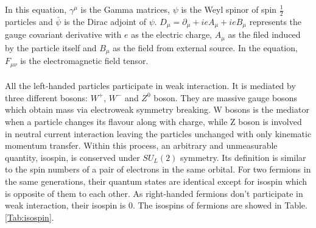 In this equation, $\gamma^\mu$ is the Gamma matrices, $\psi$ is the Weyl spinor of spin $\frac{1}{2}$ particles and $\bar{\psi}$ is the Dirac adjoint of $\psi$. $D_\mu=\partial_\mu+ieA_\mu+ieB_\mu$ represents the gauge covariant derivative with $e$ as the electric charge, $A_\mu$ as the filed induced by the particle itself and $B_\mu$ as the field from external source. In the equation, $F_{\mu\nu}$ is the electromagnetic field tensor. 
\\
\\All the left-handed particles participate in weak interaction. It is mediated by three different bosons: $W^+$, $W^-$ and $Z^0$ boson. They are massive gauge bosons which obtain mass via electroweak symmetry breaking. W bosons is the mediator when a particle changes its flavour along with charge, while Z boson is involved in neutral current interaction leaving the particles unchanged with only kinematic momentum transfer. Within this process, an arbitrary and unmeasurable quantity, isospin, is conserved under $SU_L(2)$ symmetry. Its definition is similar to the spin numbers of a pair of electrons in the same orbital. For two fermions in the same generations, their quantum states are identical except for isospin which is opposite of them to each other. As right-handed fermions don't participate in weak interaction, their isospin is 0. The isospins of fermions are showed in Table.\ref{Tab:isospin}. 
\\


